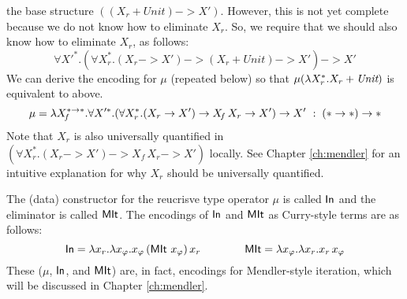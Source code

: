 the base structure $((X_r + \textit{Unit}) -> X')$.
However, this is not yet complete because we do not know how to eliminate $X_r$.
So, we require that we should also know how to eliminate $X_r$, as follows:
\[ \forall X'^{*}.
	(\forall X_r^{*}.(X_r -> X') -> (X_r + \textit{Unit}) -> X') -> X' \]
We can derive the encoding for $\mu$ (repeated below)
so that $\mu(\lambda X_r^{*}.X_r + \textit{Unit})$ is equivalent to above.
\[
\mu =
 \lambda X_{\!f}^{* -> *}.
 \forall X'^{*}.(\forall X_r^{*}.(X_r -> X') -> X_{\!f}\,X_r -> X') -> X'
 ~:\; (* -> *) -> *
\]
Note that $X_r$ is also universally quantified
in $(\forall X_r^{*}.(X_r -> X') -> X_{\!f}\,X_r -> X')$
locally.
See Chapter \ref{ch:mendler} %
for an intuitive explanation for why $X_r$ should be universally quantified.

The (data) constructor for the reucrisve type operator $\mu$ is called $\mathsf{In}$
and the eliminator is called $\mathsf{MIt}$. The encodings of $\mathsf{In}$ and $\mathsf{MIt}$ as
Curry-style terms are as follows:
\[ \mathsf{In} = \lambda x_r. \lambda x_\varphi.x_\varphi\,(\mathsf{MIt}~x_\varphi)\,x_r
\qquad\qquad \mathsf{MIt} = \lambda x_\varphi.\lambda x_r.x_r\,x_\varphi \]
These ($\mu$, $\mathsf{In}$, and $\mathsf{MIt}$) are, in fact, encodings for
Mendler-style iteration, which will be discussed in Chapter \ref{ch:mendler}.


